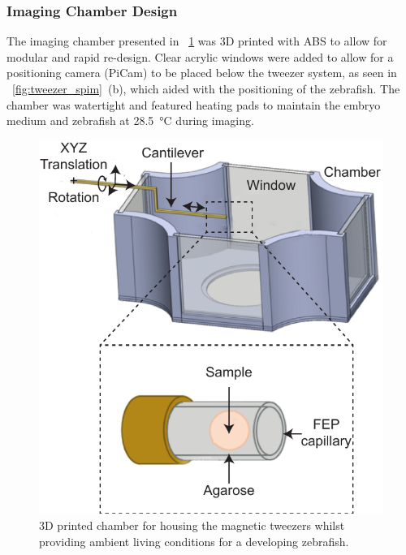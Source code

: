 \subsubsection{Imaging Chamber Design}

The imaging chamber presented in \figurename~\ref{fig:fep_chamber} was 3D printed with \gls{ABS} to allow for modular and rapid re-design.
Clear acrylic windows were added to allow for a positioning camera (PiCam) to be placed below the tweezer system, as seen in \figurename~\ref{fig:tweezer_spim}~(b), which aided with the positioning of the \gls{zebrafish}.
The chamber was watertight and featured heating pads to maintain the embryo medium and zebrafish at \SI{28.5}{\celsius} during imaging.


\begin{figure}
 \centering
 \includegraphics{Chapters/tweezers/Figs/PDF/fep_chamber}
 \caption{3D printed chamber for housing the magnetic tweezers whilst providing ambient living conditions for a developing \gls{zebrafish}.}\label{fig:fep_chamber}
\end{figure}

